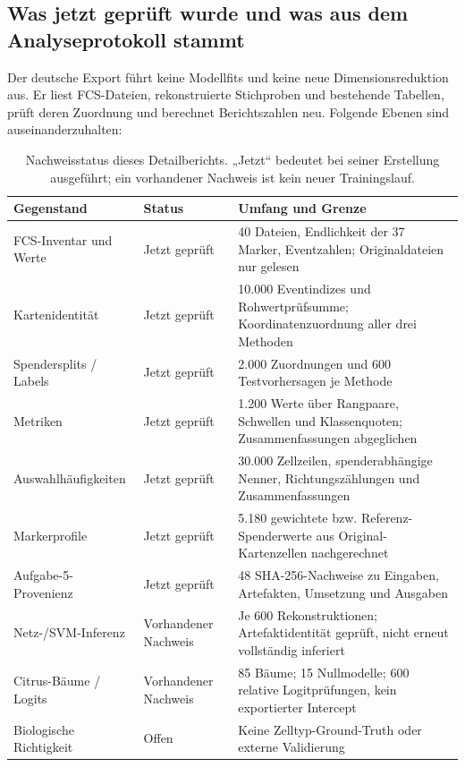\documentclass[11pt,a4paper]{article}
\newcommand{\tab}[4]{\begin{table}[!ht]\centering\caption{#2}\label{#3}{\small}#4\end{table}}
\begin{document}
\subsection*{Was jetzt geprüft wurde und was aus dem Analyseprotokoll stammt}
Der deutsche Export führt keine Modellfits und keine neue Dimensionsreduktion
aus. Er liest FCS-Dateien, rekonstruierte Stichproben und bestehende Tabellen,
prüft deren Zuordnung und berechnet Berichtszahlen neu. Folgende Ebenen
sind auseinanderzuhalten:
\begin{table}[!ht]\centering\small
\caption{Nachweisstatus dieses Detailberichts. „Jetzt“ bedeutet bei seiner
Erstellung ausgeführt; ein vorhandener Nachweis ist kein neuer Trainingslauf.}
\begin{tabular}{p{4.5cm}p{2.6cm}p{7.8cm}}\toprule
Gegenstand & Status & Umfang und Grenze\\\midrule
FCS-Inventar und Werte & Jetzt geprüft & 40 Dateien, Endlichkeit der 37 Marker, Eventzahlen; Originaldateien nur gelesen\\
Kartenidentität & Jetzt geprüft & 10.000 Eventindizes und Rohwertprüfsumme; Koordinatenzuordnung aller drei Methoden\\
Spendersplits / Labels & Jetzt geprüft & 2.000 Zuordnungen und 600 Testvorhersagen je Methode\\
Metriken & Jetzt geprüft & 1.200 Werte über Rangpaare, Schwellen und Klassenquoten; Zusammenfassungen abgeglichen\\
Auswahlhäufigkeiten & Jetzt geprüft & 30.000 Zellzeilen, spenderabhängige Nenner, Richtungszählungen und Zusammenfassungen\\
Markerprofile & Jetzt geprüft & 5.180 gewichtete bzw. Referenz-Spenderwerte aus Original-Kartenzellen nachgerechnet\\
Aufgabe-5-Provenienz & Jetzt geprüft & 48 SHA-256-Nachweise zu Eingaben, Artefakten, Umsetzung und Ausgaben\\
Netz-/SVM-Inferenz & Vorhandener Nachweis & Je 600 Rekonstruktionen; Artefaktidentität geprüft, nicht erneut vollständig inferiert\\
Citrus-Bäume / Logits & Vorhandener Nachweis & 85 Bäume; 15 Nullmodelle; 600 relative Logitprüfungen, kein exportierter Intercept\\
Biologische Richtigkeit & Offen & Keine Zelltyp-Ground-Truth oder externe Validierung\\
\bottomrule\end{tabular}
\end{table}
\tab{rekonstruktion}{Maximale Fehler des gespeicherten Aufgabe-5-Prüflaufs,
nicht eines neuen Benchmarktrainings. Bei CellCNN betrifft der Rechenfehler
die Logitidentität, bei SVM die Schwellenzentrierung, bei Citrus zentrierte
Logits. Diese Größen haben unterschiedliche Bedeutungen.}{tab:checks}{}
\end{document}
